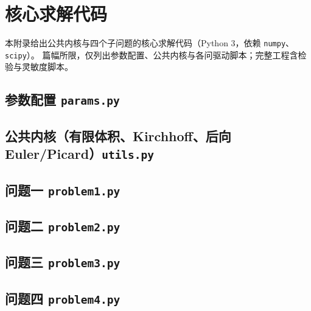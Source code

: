 \section{核心求解代码}

本附录给出公共内核与四个子问题的核心求解代码（Python 3，依赖 \texttt{numpy}、\texttt{scipy}）。
篇幅所限，仅列出参数配置、公共内核与各问驱动脚本；完整工程含检验与灵敏度脚本。

\subsection{参数配置 \texttt{params.py}}


\subsection{公共内核（有限体积、Kirchhoff、后向 Euler/Picard）\texttt{utils.py}}


\subsection{问题一 \texttt{problem1.py}}


\subsection{问题二 \texttt{problem2.py}}


\subsection{问题三 \texttt{problem3.py}}


\subsection{问题四 \texttt{problem4.py}}

